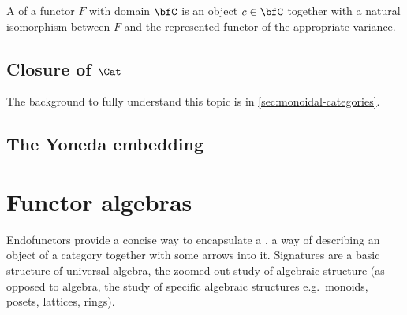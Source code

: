 \documentclass[a5paper]{article}
\newcommand{\dual}[2]{
  \begin{itemize}\renewcommand{\labelitemi}{$\circ $}
    \itemsep0em
    \item #1
    \item #2
   \end{itemize}
}
\begin{document}
\begin{definition}
  A  of a functor $F$ with domain $\bfC$ is an object
  $c\in\bfC$ together with a natural isomorphism between $F$ and the represented
  functor of the appropriate variance.
\end{definition}

\subsection{Closure of $\Cat$}

The background to fully understand this topic is in
\cref{sec:monoidal-categories}. 

\subsection{The Yoneda embedding}

\section{Functor algebras}
\label{sec:functors-and-their-algebras}


Endofunctors provide a concise way to encapsulate a
, a way of describing an object of a
category together with some arrows into it. Signatures are a basic structure
of universal algebra, the zoomed-out study of algebraic structure (as opposed to
algebra, the study of specific algebraic structures e.g.\ monoids, posets,
lattices, rings).

\end{document}
